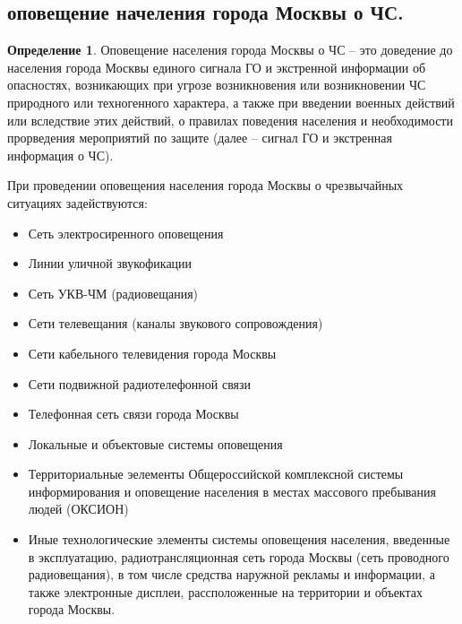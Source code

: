 \documentclass[a4paper, 12pt]{article}
\theoremstyle{definition}
\newtheorem*{definition}{Определение}
\begin{document}
        \subsection{оповещение начеления города Москвы о ЧС.}
        \begin{definition}
            Оповещение населения города Москвы о ЧС -- это доведение до населения города Москвы единого сигнала ГО и экстренной информации об опасностях, возникающих при угрозе возникновения или возникновении ЧС природного или техногенного характера, а также при введении военных действий или вследствие этих действий, о правилах поведения населения и необходимости прорведения мероприятий по защите (далее -- сигнал ГО и экстренная информация о ЧС).
        \end{definition}
        При проведении оповещения населения города Москвы о чрезвычайных ситуациях задействуются:
        \begin{itemize}
            \item Сеть электросиренного оповещения
            \item Линии уличной звукофикации
            \item Сеть УКВ-ЧМ (радиовещания)
            \item Сети телевещания (каналы звукового сопровождения)
            \item Сети кабельного телевидения города Москвы
            \item Сети подвижной радиотелефонной связи
            \item Телефонная сеть связи города Москвы
            \item Локальные и объектовые системы оповещения
            \item Территориальные эелементы Общероссийской комплексной системы информирования и оповещение населения в местах массового пребывания людей (ОКСИОН)
            \item Иные технологические элементы системы оповещения населения, введенные в эксплуатацию, радиотрансляционная сеть города Москвы (сеть проводного радиовещания), в том числе средства наружной рекламы и информации, а также электронные дисплеи, рассположенные на территории и объектах города Москвы.
        \end{itemize}
\end{document}
